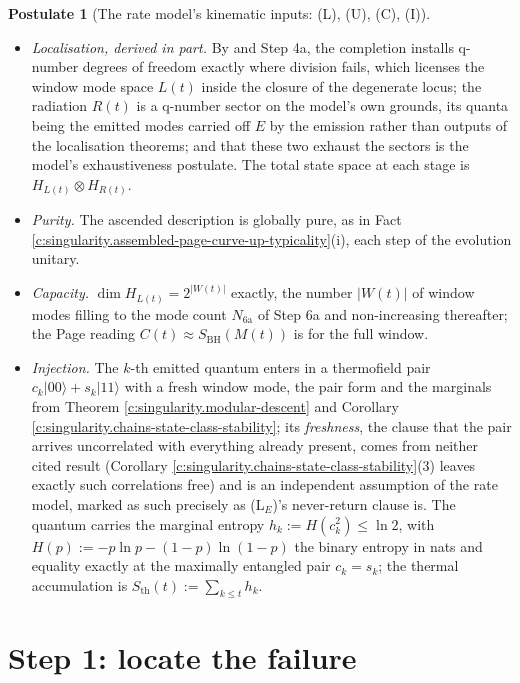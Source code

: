 \documentclass[11pt]{article}
\theoremstyle{definition}
\newtheorem{postulate}[theorem]{Postulate}
\theoremstyle{plain}
\providecommand{\Sth}{}\renewcommand{\Sth}{S_{\mathrm{th}}}
\begin{document}
\begin{postulate}[The rate model's kinematic inputs: (L), (U), (C), (I)]\label{c:singularity.rate-models-kinematic-inputs-l-u}
\leavevmode
\begin{itemize}
\item[(L)] \emph{Localisation, derived in part.} By \cite[Thm.~4.4, Cor.~4.5, Thms 8.7, 8.12]{ButlerT4} and Step 4a, the completion installs q-number degrees of freedom exactly where division fails, which licenses the window mode space $L(t)$ inside the closure of the degenerate locus; the radiation $R(t)$ is a q-number sector on the model's own grounds, its quanta being the emitted modes carried off $E$ by the emission rather than outputs of the localisation theorems; and that these two exhaust the sectors is the model's exhaustiveness postulate. The total state space at each stage is $H_{L(t)} \otimes H_{R(t)}$.
\item[(U)] \emph{Purity.} The ascended description is globally pure, as in Fact \ref{c:singularity.assembled-page-curve-up-typicality}(i), each step of the evolution unitary.
\item[(C)] \emph{Capacity.} $\dim H_{L(t)} = 2^{|W(t)|}$ exactly, the number $|W(t)|$ of window modes filling to the mode count $N_{\mathrm{6a}}$ of Step 6a and non-increasing thereafter; the Page reading $C(t) \approx S_{\mathrm{BH}}(M(t))$ is for the full window.
\item[(I)] \emph{Injection.} The $k$-th emitted quantum enters in a thermofield pair $c_k|00\rangle + s_k|11\rangle$ with a fresh window mode, the pair form and the marginals from Theorem \ref{c:singularity.modular-descent} and Corollary \ref{c:singularity.chains-state-class-stability}; its \emph{freshness}, the clause that the pair arrives uncorrelated with everything already present, comes from neither cited result (Corollary \ref{c:singularity.chains-state-class-stability}(3) leaves exactly such correlations free) and is an independent assumption of the rate model, marked as such precisely as (L$_E$)'s never-return clause is. The quantum carries the marginal entropy $h_k := H(c_k^{2}) \leq \ln 2$, with $H(p) := -p\ln p - (1-p)\ln(1-p)$ the binary entropy in nats and equality exactly at the maximally entangled pair $c_k = s_k$; the thermal accumulation is $\Sth(t) := \sum_{k \leq t} h_k$.
\end{itemize}
\end{postulate}

\section{Step 1: locate the failure}
\end{document}
